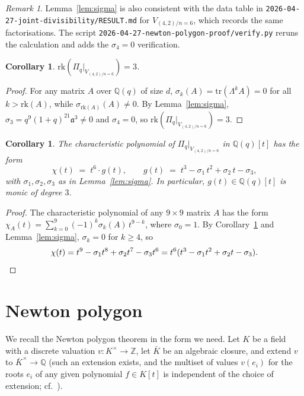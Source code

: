 \documentclass[11pt]{article}
\theoremstyle{plain}
\newtheorem{corollary}[theorem]{Corollary}
\theoremstyle{definition}
\theoremstyle{remark}
\newtheorem{remark}[theorem]{Remark}
\newcommand{\Z}{\mathbb{Z}}
\newcommand{\Q}{\mathbb{Q}}
\newcommand{\Pibs}{\Pi_q}
\newcommand{\trace}{\mathrm{tr}}
\newcommand{\rk}{\mathrm{rk}}
\newcommand{\atom}{\mathfrak{a}}
\begin{document}
\begin{remark}
Lemma~\ref{lem:sigma} is also consistent with the data table in
\texttt{2026-04-27-joint-divisibility/RESULT.md} for $V_{(4,2)/n=6}$, which records
the same factorisations.  The script
\texttt{2026-04-27-newton-polygon-proof/verify.py} reruns the calculation and adds
the $\sigma_4 = 0$ verification.
\end{remark}

\begin{corollary}
\label{cor:rank3}
$\rk(\Pibs|_{V_{(4,2)/n=6}}) = 3$.
\end{corollary}

\begin{proof}
For any matrix $A$ over $\Q(q)$ of size $d$, $\sigma_k(A) = \trace(\Lambda^k A) = 0$
for all $k > \rk(A)$, while $\sigma_{\rk(A)}(A) \neq 0$.  By
Lemma~\ref{lem:sigma}, $\sigma_3 = q^9(1+q)^{21}\atom^3 \neq 0$ and $\sigma_4 = 0$,
so $\rk(\Pibs|_{V_{(4,2)/n=6}}) = 3$.
\end{proof}

\begin{corollary}
\label{cor:cubic}
The characteristic polynomial of $\Pibs|_{V_{(4,2)/n=6}}$ in $\Q(q)[t]$ has the form
\[ \chi(t) \;=\; t^6 \cdot g(t), \qquad
   g(t) \;=\; t^3 - \sigma_1\, t^2 + \sigma_2\, t - \sigma_3, \]
with $\sigma_1, \sigma_2, \sigma_3$ as in Lemma~\ref{lem:sigma}.  In particular,
$g(t) \in \Q(q)[t]$ is monic of degree $3$.
\end{corollary}

\begin{proof}
The characteristic polynomial of any $9 \times 9$ matrix $A$ has the form
$\chi_A(t) = \sum_{k=0}^{9} (-1)^k \sigma_k(A)\, t^{9-k}$, where $\sigma_0 = 1$.  By
Corollary~\ref{cor:rank3} and Lemma~\ref{lem:sigma}, $\sigma_k = 0$ for $k \geq 4$,
so
\[ \chi(t) = t^9 - \sigma_1 t^8 + \sigma_2 t^7 - \sigma_3 t^6
          = t^6(t^3 - \sigma_1 t^2 + \sigma_2 t - \sigma_3). \qedhere \]
\end{proof}

\section{Newton polygon}

We recall the Newton polygon theorem in the form we need.  Let $K$ be a field with
a discrete valuation $v \colon K^\times \to \Z$, let $\bar{K}$ be an algebraic
closure, and extend $v$ to $\bar K^\times \to \Q$ (such an extension exists, and
the multiset of values $v(e_i)$ for the roots $e_i$ of any given polynomial
$f \in K[t]$ is independent of the choice of extension; cf.\
\cite[Ch.~II,~\S 6]{Neukirch}).
\end{document}

